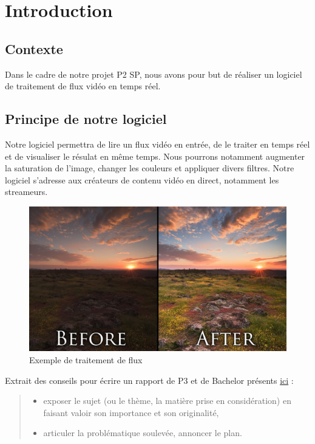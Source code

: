 \chapter{Introduction}

\section{Contexte}
Dans le cadre de notre projet P2 SP, nous avons pour but de réaliser un logiciel de traitement de flux vidéo en temps réel.

\section{Principe de notre logiciel}

Notre logiciel permettra de lire un flux vidéo en entrée, de le traiter en temps réel et de visualiser le résulat en même temps.
Nous pourrons notamment augmenter la saturation de l'image, changer les couleurs et appliquer divers filtres.
Notre logiciel s'adresse aux créateurs de contenu vidéo en direct, notamment les streameurs.

\begin{figure}[h]
  \centering
  \includegraphics[width=\textwidth]{./images/image_processing_exemple.jpg}
  \caption{Exemple de traitement de flux}
  \label{image_processing_exemple}
\end{figure}

Extrait des conseils pour écrire un rapport de P3 et de Bachelor présents \href{https://gitlab-etu.ing.he-arc.ch/isc/documentation/projet-p3-et-bachelor/-/wikis/help-report}{ici} :
\begin{quote}    
  \begin{itemize}   
    \item exposer le sujet (ou le thème, la matière prise en considération) en faisant valoir son importance et son originalité,
    \item articuler la problématique soulevée,
    annoncer le plan.
  \end{itemize}
\end{quote}

